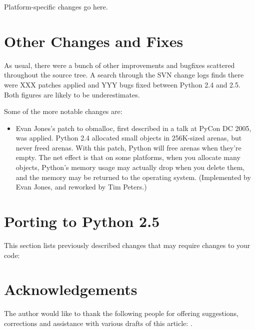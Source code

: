 \documentclass{howto}
\begin{document}
Platform-specific changes go here.


\section{Other Changes and Fixes \label{section-other}}

As usual, there were a bunch of other improvements and bugfixes
scattered throughout the source tree.  A search through the SVN change
logs finds there were XXX patches applied and YYY bugs fixed between
Python 2.4 and 2.5.  Both figures are likely to be underestimates.

Some of the more notable changes are:

\begin{itemize}

\item Evan Jones's patch to obmalloc, first described in a talk
at PyCon DC 2005, was applied.  Python 2.4 allocated small objects in
256K-sized arenas, but never freed arenas.  With this patch, Python
will free arenas when they're empty.  The net effect is that on some
platforms, when you allocate many objects, Python's memory usage may
actually drop when you delete them, and the memory may be returned to
the operating system.  (Implemented by Evan Jones, and reworked by Tim
Peters.)

\end{itemize}


\section{Porting to Python 2.5}

This section lists previously described changes that may require
changes to your code:

\begin{itemize}


\end{itemize}


\section{Acknowledgements \label{acks}}

The author would like to thank the following people for offering
suggestions, corrections and assistance with various drafts of this
article: .
\end{document}
